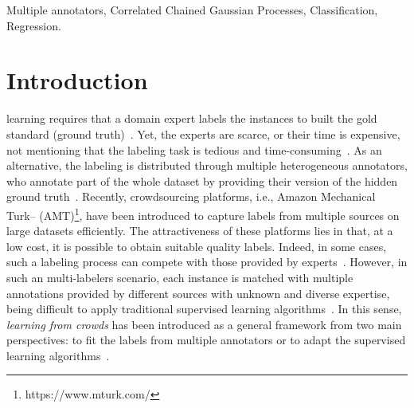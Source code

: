 \documentclass[journal]{IEEEtran}
\begin{document}
\begin{IEEEkeywords}
Multiple annotators, Correlated Chained Gaussian Processes, Classification, Regression.
\end{IEEEkeywords}

%
\IEEEpeerreviewmaketitle



\section{Introduction}

 learning requires that a domain expert labels the instances to built the gold standard (ground truth)~\cite{zhang2019crowdsourced}. Yet, the experts are scarce, or their time is expensive, not mentioning that the labeling task is tedious and
time-consuming~\cite{liu2020truth}. As an alternative, the labeling is distributed through multiple
heterogeneous annotators, who annotate part of the whole dataset by providing their
version of the hidden ground truth~\cite{kara2015modeling}.
Recently, crowdsourcing platforms, i.e., Amazon Mechanical Turk-- (AMT)\footnote{https://www.mturk.com/}, have been introduced to capture labels from multiple sources on large datasets efficiently. The attractiveness of these platforms lies in that, at a low cost, it is possible to obtain suitable quality labels. Indeed, in some cases, such a labeling process can compete with those provided by
experts~\cite{snow2008cheap}. However, in such an multi-labelers scenario, each instance is matched with multiple annotations provided by different
sources with unknown and diverse expertise, being difficult to apply traditional supervised learning
algorithms~\cite{tao2018domain}. In this sense, \emph{learning from crowds} has been introduced as a general framework from two main perspectives: to fit the labels from multiple annotators or to adapt the
supervised learning algorithms~\cite{rizos2020average}. 
\end{document}
